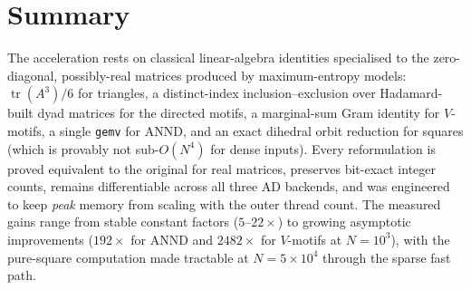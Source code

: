 \documentclass[11pt]{article}
\theoremstyle{plain}
\theoremstyle{definition}
\newcommand{\tr}{\operatorname{tr}}
\begin{document}
\section{Summary}
\label{sec:summary}
The acceleration rests on classical linear-algebra identities specialised to the zero-diagonal,
possibly-real matrices produced by maximum-entropy models: $\tr(A^3)/6$ for triangles, a distinct-index
inclusion--exclusion over Hadamard-built dyad matrices for the directed motifs, a marginal-sum Gram identity
for $V$-motifs, a single \texttt{gemv} for ANND, and an exact dihedral orbit reduction for squares (which is
provably not sub-$O(N^4)$ for dense inputs). Every reformulation is proved equivalent to the original for
real matrices, preserves bit-exact integer counts, remains differentiable across all three AD backends, and
was engineered to keep \emph{peak} memory from scaling with the outer thread count. The measured gains range
from stable constant factors ($5$--$22\times$) to growing asymptotic improvements
($192\times$ for ANND and $2482\times$ for $V$-motifs at $N=10^3$), with the pure-square computation made
tractable at $N=5\times10^4$ through the sparse fast path.
\end{document}
